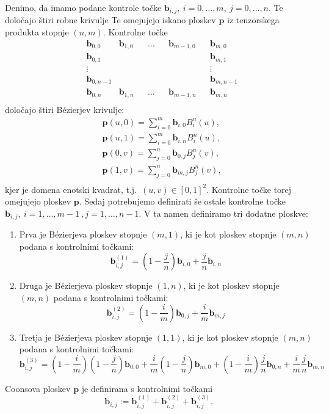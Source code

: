 \documentclass[a4paper,12pt]{article}
\begin{document}
Denimo, da imamo podane kontrole točke $\mathbf{b}_{i,j},~ i=0,\ldots,m,~ j=0,\ldots,n$.
Te določajo štiri robne krivulje 
Te omejujejo iskano ploskev $\mathbf{p}$ iz tenzorskega produkta stopnje $(n,m)$.
Kontrolne točke
\begin{align*}
      &\mathbf{b}_{0,0} &\mathbf{b}_{1,0} & &\ldots & &\mathbf{b}_{m-1,0} & &\mathbf{b}_{m,0} \\
      &\mathbf{b}_{0,1}  &  & &  & &  & &\mathbf{b}_{m,1} \\
      &\vdots  &  &  & &  & & &\vdots\\
      &\mathbf{b}_{0,n-1}  &  &  & &  & &  &\mathbf{b}_{m,n-1} \\ 
      &\mathbf{b}_{0,n} &\mathbf{b}_{1,n} & &\ldots & &\mathbf{b}_{m-1,n} & &\mathbf{b}_{m,n} \\
\end{align*}
določajo štiri Bézierjev krivulje: 
\begin{align*}
   &\mathbf{p}(u,0) =\sum_{i=0}^m \mathbf{b}_{i,0} B_i^n(u),  \\
   &\mathbf{p}(u,1) =\sum_{i=0}^m \mathbf{b}_{i,n} B_i^n(u),  \\
   &\mathbf{p}(0,v) =\sum_{j=0}^n \mathbf{b}_{0,j} B_j^n(v),  \\
   &\mathbf{p}(1,v) =\sum_{j=0}^n \mathbf{b}_{m,j} B_j^n(v),  \\
\end{align*}
kjer je domena enotski kvadrat, t.j.~$(u,v) \in [0,1]^2$.
Kontrolne točke torej omejujejo ploskev $\mathbf{p}$. 
Sedaj potrebujemo definirati še ostale kontrolne točke 
$\mathbf{b}_{i,j},~ i=1,\ldots, m-1~, j=1,\ldots,n-1$. 
V ta namen definiramo tri dodatne ploskve:
\begin{enumerate}
   \item Prva je Bézierjeva ploskev stopnje $(m, 1)$, ki je kot ploskev stopnje $(m,n)$ podana s kontrolnimi točkami:
   $$\mathbf{b}_{i,j}^{(1)} = \left(1-\frac{j}{n}  \right) \mathbf{b}_{i,0} + \frac{j}{n} \mathbf{b}_{i,n} $$
   \item Druga je Bézierjeva ploskev stopnje $(1, n)$, ki je kot ploskev stopnje $(m,n)$ podana s kontrolnimi točkami:
   $$\mathbf{b}_{i,j}^{(2)} = \left(1-\frac{i}{m}  \right) \mathbf{b}_{0,j} + \frac{i}{m} \mathbf{b}_{m,j} $$
   \item Tretja je Bézierjeva ploskev stopnje $(1, 1)$, ki je kot ploskev stopnje $(m,n)$ podana s kontrolnimi točkami:
   $$
   \mathbf{b}_{i,j}^{(3)} = \left(1-\frac{i}{m}  \right) \left(1-\frac{j}{n}  \right) \mathbf{b}_{0,0} 
         + \frac{i}{m} \left(1-\frac{j}{n}  \right) \mathbf{b}_{m,0}
         + \left(1-\frac{i}{m}  \right) \frac{j}{n}  \mathbf{b}_{0,n} 
         + \frac{i}{m} \frac{j}{n} \mathbf{b}_{m,n} 
   $$
\end{enumerate}
Coonsova ploskev $\mathbf{p}$ je definirana s kontrolnimi točkami 
$$\mathbf{b}_{i,j} := \mathbf{b}_{i,j}^{(1)}+\mathbf{b}_{i,j}^{(2)}+\mathbf{b}_{i,j}^{(3)}.$$
\end{document}

